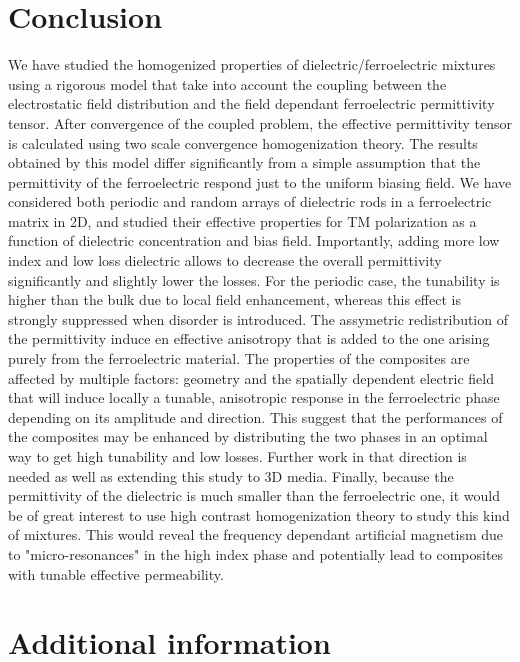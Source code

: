 \documentclass[aps,prb,11pt]{revtex4-1}
\begin{document}
%


\section{Conclusion}

We have studied the homogenized properties of dielectric/ferroelectric mixtures
using a rigorous model that take into account the coupling between the electrostatic
field distribution and the field dependant ferroelectric permittivity tensor. After
convergence of the coupled problem, the effective permittivity tensor is calculated using
two scale convergence homogenization theory.
The results obtained by this model differ significantly from a simple assumption that
the permittivity of the ferroelectric respond just to the uniform biasing field.
We have considered both periodic and random arrays
of dielectric rods in a ferroelectric matrix in 2D, and studied their effective properties
for TM polarization as a function of dielectric concentration and bias field.
Importantly, adding more low index and low loss dielectric allows to decrease
the overall permittivity significantly and slightly lower the losses.
For the periodic case, the tunability is higher than the bulk due to local field enhancement, whereas
this effect is strongly suppressed when disorder is introduced. The assymetric redistribution of the permittivity
induce en effective anisotropy that is added to the one arising purely from the ferroelectric material.
The properties of the composites are affected by multiple factors:
geometry and the spatially dependent electric field that will induce locally a tunable, anisotropic
response in the ferroelectric phase depending on its amplitude and direction.
This suggest that the performances of the composites
may be enhanced by distributing the two phases in an optimal way to get high
tunability and low losses. Further work in that direction is needed as well as
extending this study to 3D media.
Finally, because the permittivity of the dielectric is much smaller than the ferroelectric one,
it would be of great interest to use high contrast homogenization theory
\cite{bouchitte_homogenization_2004, cherednichenko_homogenization_2015} to
study this kind of mixtures.
This would reveal the frequency dependant artificial magnetism due to "micro-resonances"
in the high index phase and potentially lead to composites with tunable effective permeability.

\section*{Additional information}
\end{document}
